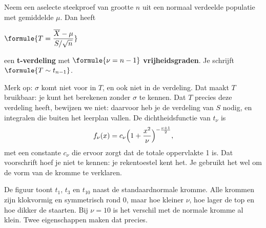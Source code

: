 \begin{theorie}
Neem een aselecte steekproef van grootte $n$ uit een normaal verdeelde populatie met gemiddelde $\mu$. Dan heeft

\vspace{1mm}
\qquad $\formule{T = \dfrac{\overline{X} - \mu}{S/\sqrt{n}}}$

\vspace{1mm}
een \textbf{\textcolor{accent}{t-verdeling}} met $\formule{\nu = n - 1}$ \textbf{\textcolor{accent}{vrijheidsgraden}}. Je schrijft $\formule{T \sim t_{n-1}}$.
\end{theorie}

Merk op: $\sigma$ komt niet voor in $T$, en ook niet in de verdeling. Dat maakt $T$ bruikbaar: je kunt het berekenen zonder $\sigma$ te kennen. Dat $T$ precies deze verdeling heeft, bewijzen we niet: daarvoor heb je de verdeling van $S$ nodig, en integralen die buiten het leerplan vallen. De dichtheidsfunctie van $t_\nu$ is
\[ f_\nu(x) = c_\nu \Bigl(1 + \frac{x^2}{\nu}\Bigr)^{-\frac{\nu + 1}{2}} , \]
met een constante $c_\nu$ die ervoor zorgt dat de totale oppervlakte 1 is. Dat voorschrift hoef je niet te kennen: je rekentoestel kent het. Je gebruikt het wel om de vorm van de kromme te verklaren.


De figuur toont $t_1$, $t_3$ en $t_{10}$ naast de standaardnormale kromme. Alle krommen zijn klokvormig en symmetrisch rond 0, maar hoe kleiner $\nu$, hoe lager de top en hoe dikker de staarten. Bij $\nu = 10$ is het verschil met de normale kromme al klein. Twee eigenschappen maken dat precies.

